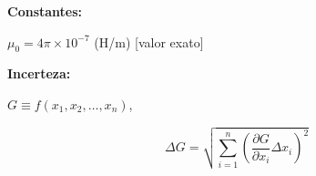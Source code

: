 \documentclass[11pt,a4paper,final]{article}
\begin{document}
\cleardoublepage

\noindent\textbf{Constantes:}

\noindent$\mu_0=4\pi\times10^{-7}$ (H/m) [valor exato]

\noindent\textbf{Incerteza:}

\noindent$G \equiv f\left(x_1,x_2,\dotsc,x_n\right)$,

\begin{equation*}
\Delta G = \sqrt{\sum_{i=1}^{n}{\left(\frac{\partial G}{\partial x_i}\Delta x_i\right)^2}}
\end{equation*}
\end{document}
